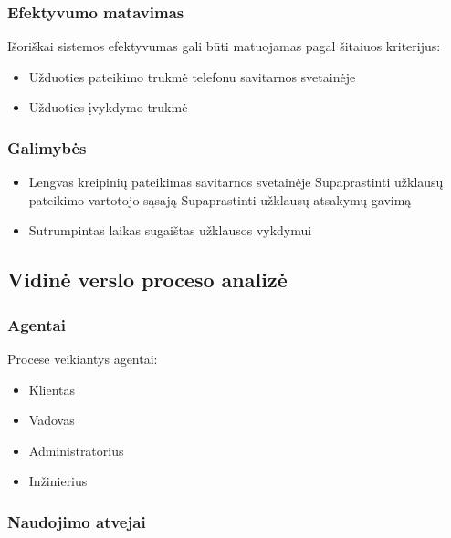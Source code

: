 		\subsubsection{Efektyvumo matavimas}
		
			Išoriškai sistemos efektyvumas gali būti matuojamas pagal šitaiuos kriterijus:
			\begin{itemize}
				\item Užduoties pateikimo trukmė
					\subitem telefonu
					\subitem savitarnos svetainėje
				\item Užduoties įvykdymo trukmė
			\end{itemize}

		\subsubsection{Galimybės}

			\begin{itemize}
				\item Lengvas kreipinių pateikimas savitarnos svetainėje
					\subitem Supaprastinti užklausų pateikimo vartotojo sąsają
					\subitem Supaprastinti užklausų atsakymų gavimą
				\item Sutrumpintas laikas sugaištas užklausos vykdymui
			\end{itemize}

	\subsection{Vidinė verslo proceso analizė}

		\subsubsection{Agentai}
			Procese veikiantys agentai:
			\begin{itemize}
				\item Klientas
				\item Vadovas
				\item Administratorius
				\item Inžinierius
			\end{itemize}

		\subsubsection{Naudojimo atvejai}

